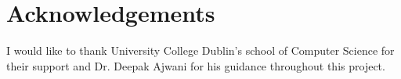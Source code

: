 \documentclass[]{UCD_CS_FYP_Report}
\begin{document}
%


\chapter*{Acknowledgements}
I would like to thank University College Dublin’s school of Computer Science for their support and Dr. Deepak Ajwani for his guidance throughout this project.


\printbibliography


\end{document}
